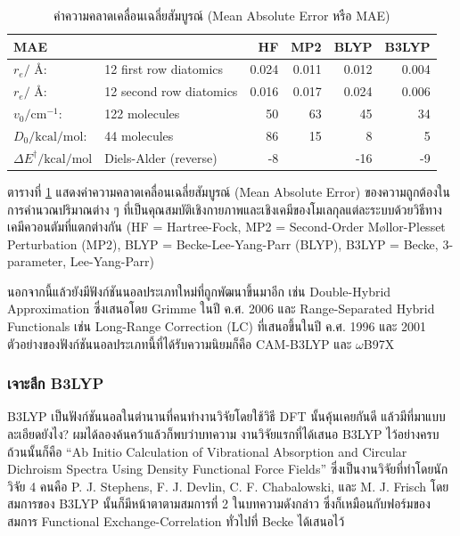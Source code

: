 \begin{table}[htbp]
  \begin{tabular}{llrrrr}
    \hline \hline MAE                                   &                         & HF    & MP2   & BLYP  & B3LYP \\
    \hline$r_e /$ \AA :                                 & 12 first row diatomics  & 0.024 & 0.011 & 0.012 & 0.004 \\
    $r_e /$ \AA :                                       & 12 second row diatomics & 0.016 & 0.017 & 0.024 & 0.006 \\
    $v_0 / \mathrm{cm}^{-1}:$                           & 122 molecules           & 50    & 63    & 45    & 34    \\
    $D_0 / \mathrm{kcal} / \mathrm{mol}:$               & 44 molecules            & 86    & 15    & 8     & 5     \\
    $\Delta E^{\dagger} / \mathrm{kcal} / \mathrm{mol}$ & Diels-Alder (reverse)   & -8    &       & -16   & -9    \\
    \hline \hline
  \end{tabular}
  \caption{ค่าความคลาดเคลื่อนเฉลี่ยสัมบูรณ์ (Mean Absolute Error หรือ MAE)}
  \label{tab:mae_qm_methods}
\end{table}

ตารางที่ \ref{tab:mae_qm_methods} แสดงค่าความคลาดเคลื่อนเฉลี่ยสัมบูรณ์ (Mean Absolute Error) ของความถูกต้องในการคำนวณปริมาณต่าง ๆ
ที่เป็นคุณสมบัติเชิงกายภาพและเชิงเคมีของโมเลกุลแต่ละระบบด้วยวิธีทางเคมีควอนตัมที่แตกต่างกัน (HF = Hartree-Fock, MP2 = Second-Order
M\o{}llor-Plesset Perturbation (MP2), BLYP = Becke-Lee-Yang-Parr (BLYP), B3LYP = Becke, 3-parameter, Lee-Yang-Parr)

นอกจากนี้แล้วยังมีฟังก์ชันนอลประเภทใหม่ที่ถูกพัฒนาขึ้นมาอีก เช่น Double-Hybrid Approximation ซึ่งเสนอโดย Grimme ในปี ค.ศ. 2006
และ Range-Separated Hybrid Functionals เช่น Long-Range Correction (LC) ที่เสนอขึ้นในปี ค.ศ. 1996 และ 2001 
ตัวอย่างของฟังก์ชันนอลประเภทนี้ที่ได้รับความนิยมก็คือ CAM-B3LYP และ $\omega$B97X

\subsubsection{เจาะลึก B3LYP}

B3LYP เป็นฟังก์ชันนอลในตำนานที่คนทำงานวิจัยโดยใช้วิธี DFT นั้นคุ้นเคยกันดี แล้วมีที่มาแบบละเอียดยังไง? ผมได้ลองค้นคว้าแล้วก็พบว่าบทความ%
งานวิจัยแรกที่ได้เสนอ B3LYP ไว้อย่างครบถ้วนนั้นก็คือ \enquote{Ab Initio Calculation of Vibrational Absorption and Circular
  Dichroism Spectra Using Density Functional Force Fields}\autocite{stephens1994} ซึ่งเป็นงานวิจัยที่ทำโดยนักวิจัย 4 คนคือ
P. J. Stephens, F. J. Devlin, C. F. Chabalowski, และ M. J. Frisch โดยสมการของ B3LYP นั้นก็มีหน้าตาตามสมการที่ 2
ในบทความดังกล่าว ซึ่งก็เหมือนกับฟอร์มของสมการ Functional Exchange-Correlation ทั่วไปที่ Becke ได้เสนอไว้


